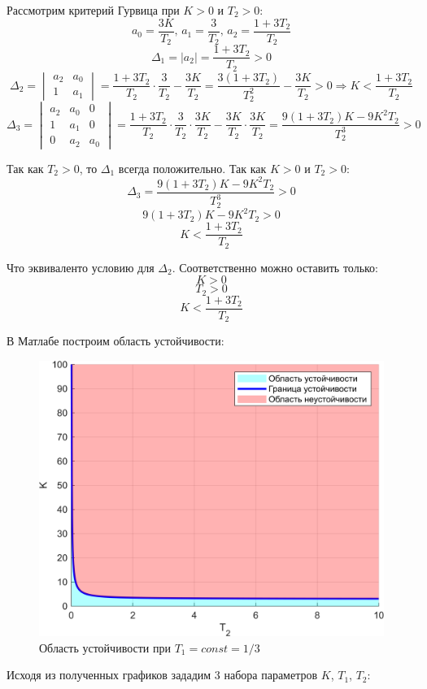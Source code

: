 Рассмотрим критерий Гурвица при \( K>0 \) и \( T_2>0 \):
\[
    a_0 = \frac{3K}{T_2}, \, a_1 = \frac{3}{T_2}, \, a_2 = \frac{1 + 3T_2}{T_2}
\]
\[
\Delta_1 = |a_2| = \frac{1 + 3T_2}{T_2} > 0
\]
\[
\Delta_2 = \begin{vmatrix}
    a_2 & a_0 \\
    1 & a_1
\end{vmatrix}
= \frac{1 + 3T_2}{T_2} \cdot \frac{3}{T_2} - \frac{3K}{T_2} = \frac{3(1+3T_2)}{T_2^2} - \frac{3K}{T_2} > 0
\Rightarrow K < \frac{1+3T_2}{T_2}
\]
\[
\Delta_3 = \begin{vmatrix}
    a_2 & a_0 & 0 \\
    1 & a_1 & 0 \\
    0 & a_2 & a_0
\end{vmatrix} =
\frac{1 + 3T_2}{T_2} \cdot \frac{3}{T_2} \cdot \frac{3K}{T_2} - \frac{3K}{T_2} \cdot \frac{3K}{T_2}
= \frac{9(1+3T_2)K - 9K^2T_2}{T_2^3} > 0
\]

Так как \( T_2 > 0 \), то \(\Delta_1\) всегда положительно. Так как \( K > 0 \) и \( T_2 > 0 \):
\[
\Delta_3 = \frac{9(1+3T_2)K - 9K^2T_2}{T_2^3} > 0
\]
\[
    9(1+3T_2)K - 9 K^2 T_2 > 0
\]
\[
    K < \frac{1+3T_2}{T_2}
\]

Что эквиваленто условию для $\Delta_2$. Соответственно можно оставить только:
\[
    K > 0
\]
\[
    T_2 > 0
\]
\[
    K < \frac{1+3T_2}{T_2}
\]


В Матлабе построим область устойчивости:
\begin{figure}[H]
    \centering
    \includegraphics[width=1\textwidth]{../images/2_2.png}
    \caption{Область устойчивости при \( T_1 = const = 1/3 \)}
\end{figure}
\newpage
Исходя из полученных графиков зададим 3 набора параметров \( K \), \( T_1 \), \( T_2 \):

